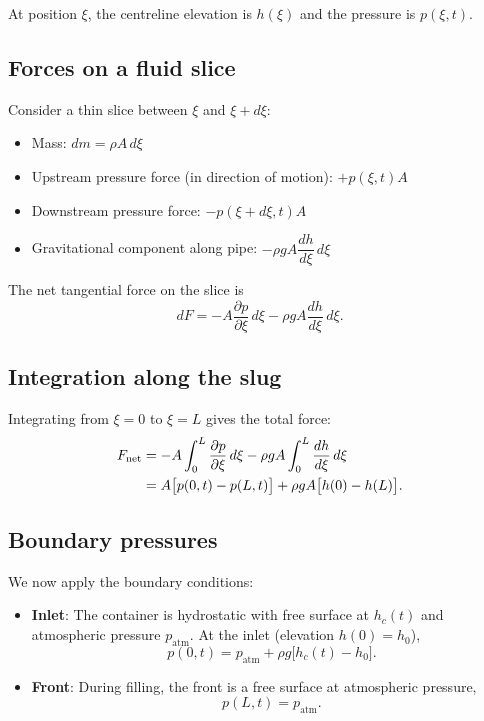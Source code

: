 \documentclass[11pt]{article}
\theoremstyle{definition}
\begin{document}
At position $\xi$, the centreline elevation is $h(\xi)$ and the pressure is $p(\xi, t)$.

\subsection{Forces on a fluid slice}

Consider a thin slice between $\xi$ and $\xi + d\xi$:
\begin{itemize}[nosep]
  \item Mass: $dm = \rho A\,d\xi$
  \item Upstream pressure force (in direction of motion): $+p(\xi, t) A$
  \item Downstream pressure force: $-p(\xi + d\xi, t) A$
  \item Gravitational component along pipe: $-\rho g A \dfrac{dh}{d\xi}\,d\xi$
\end{itemize}
The net tangential force on the slice is
\[
  dF = -A \frac{\partial p}{\partial \xi}\,d\xi - \rho g A \frac{dh}{d\xi}\,d\xi.
\]

\subsection{Integration along the slug}

Integrating from $\xi = 0$ to $\xi = L$ gives the total force:
\begin{align}
  F_{\text{net}} &= -A \int_0^L \frac{\partial p}{\partial \xi}\,d\xi 
                   - \rho g A \int_0^L \frac{dh}{d\xi}\,d\xi \notag \\
                 &= A\bigl[p(0,t) - p(L,t)\bigr] + \rho g A\bigl[h(0) - h(L)\bigr].
  \label{eq:Fnet-raw}
\end{align}

\subsection{Boundary pressures}

We now apply the boundary conditions:
\begin{itemize}[nosep]
  \item \textbf{Inlet}: The container is hydrostatic with free surface at $h_c(t)$ and 
        atmospheric pressure $p_{\text{atm}}$. At the inlet (elevation $h(0) = h_0$),
        \[
          p(0,t) = p_{\text{atm}} + \rho g\bigl[h_c(t) - h_0\bigr].
        \]
  \item \textbf{Front}: During filling, the front is a free surface at atmospheric pressure,
        \[
          p(L,t) = p_{\text{atm}}.
        \]
\end{itemize}
\end{document}
